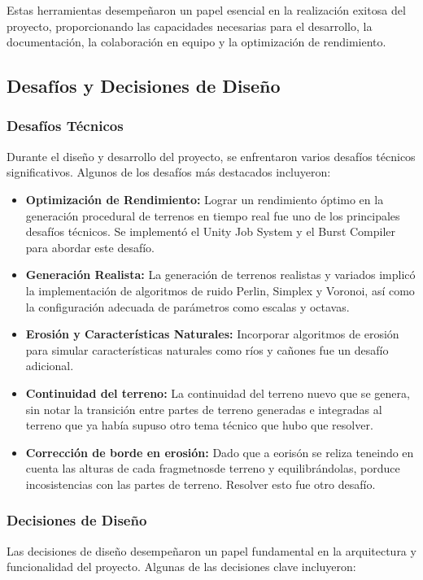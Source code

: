 Estas herramientas desempeñaron un papel esencial en la realización exitosa del proyecto, proporcionando las capacidades necesarias para el desarrollo, la documentación, la colaboración en equipo y la optimización de rendimiento.

\subsection{Desafíos y Decisiones de Diseño}

\subsubsection{Desafíos Técnicos}
Durante el diseño y desarrollo del proyecto, se enfrentaron varios desafíos técnicos significativos. Algunos de los desafíos más destacados incluyeron:

\begin{itemize}
    \item \textbf{Optimización de Rendimiento:} Lograr un rendimiento óptimo en la generación procedural de terrenos en tiempo real fue uno de los principales desafíos técnicos. Se implementó el Unity Job System y el Burst Compiler para abordar este desafío.
    
    \item \textbf{Generación Realista:} La generación de terrenos realistas y variados implicó la implementación de algoritmos de ruido Perlin, Simplex y Voronoi, así como la configuración adecuada de parámetros como escalas y octavas.
    
    \item \textbf{Erosión y Características Naturales:} Incorporar algoritmos de erosión para simular características naturales como ríos y cañones fue un desafío adicional.
    
    \item \textbf{Continuidad del terreno:} La continuidad del terreno nuevo que se genera, sin notar la transición entre partes de terreno generadas e integradas al terreno que ya había supuso otro tema técnico que hubo que resolver.
    
    \item \textbf{Corrección de borde en erosión:} Dado que a eorisón se reliza teneindo en cuenta las alturas de cada fragmetnosde terreno y equilibrándolas, porduce incosistencias con las partes de terreno. Resolver esto fue otro desafío.
\end{itemize}

\subsubsection{Decisiones de Diseño}
Las decisiones de diseño desempeñaron un papel fundamental en la arquitectura y funcionalidad del proyecto. Algunas de las decisiones clave incluyeron:

